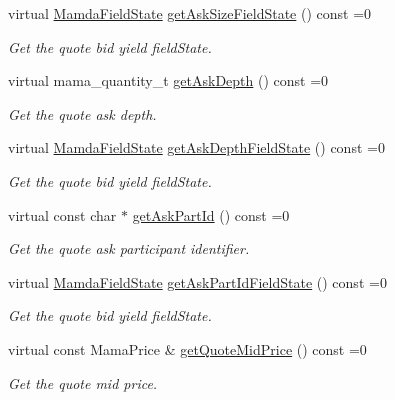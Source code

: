 \begin{CompactItemize}
virtual \hyperlink{namespaceWombat_93aac974f2ab713554fd12a1fa3b7d2a}{Mamda\-Field\-State} \hyperlink{classWombat_1_1MamdaQuoteOutOfSequence_df0784fb2f32f6deec369c5f0fbc269b}{get\-Ask\-Size\-Field\-State} () const =0
\begin{CompactList}\small\item\em Get the quote bid yield field\-State. \item\end{CompactList}\item 
virtual mama\_\-quantity\_\-t \hyperlink{classWombat_1_1MamdaQuoteOutOfSequence_c225d8c6500428e7ab5c34c1a403a230}{get\-Ask\-Depth} () const =0
\begin{CompactList}\small\item\em Get the quote ask depth. \item\end{CompactList}\item 
virtual \hyperlink{namespaceWombat_93aac974f2ab713554fd12a1fa3b7d2a}{Mamda\-Field\-State} \hyperlink{classWombat_1_1MamdaQuoteOutOfSequence_60ddd7a94b309e3a80aec05000be0c0e}{get\-Ask\-Depth\-Field\-State} () const =0
\begin{CompactList}\small\item\em Get the quote bid yield field\-State. \item\end{CompactList}\item 
virtual const char $\ast$ \hyperlink{classWombat_1_1MamdaQuoteOutOfSequence_12c5be28761ab6796c44466e06bbc37a}{get\-Ask\-Part\-Id} () const =0
\begin{CompactList}\small\item\em Get the quote ask participant identifier. \item\end{CompactList}\item 
virtual \hyperlink{namespaceWombat_93aac974f2ab713554fd12a1fa3b7d2a}{Mamda\-Field\-State} \hyperlink{classWombat_1_1MamdaQuoteOutOfSequence_bf3a795aa218100f1d59fa05aec2748e}{get\-Ask\-Part\-Id\-Field\-State} () const =0
\begin{CompactList}\small\item\em Get the quote bid yield field\-State. \item\end{CompactList}\item 
virtual const Mama\-Price \& \hyperlink{classWombat_1_1MamdaQuoteOutOfSequence_fa1e82ccf6a101f0581a557399ea9adc}{get\-Quote\-Mid\-Price} () const =0
\begin{CompactList}\small\item\em Get the quote mid price. \item\end{CompactList}\item 

\end{CompactItemize}

